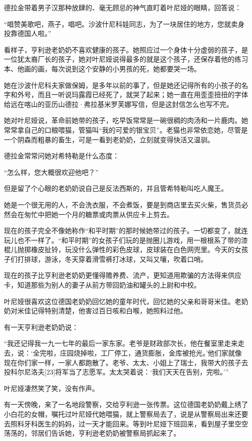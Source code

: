 德拉金带着男子汉那种放肆的、毫无顾忌的神气直盯着叶尼娅的眼睛，回答说：

“唱赞美歌吧，燕子，唱吧。沙波什尼科娃同志，为了一块居住的地方，您就卖身投靠德国人啦。”

看样子，亨利逊老奶奶不喜欢健康的孩子。她照应过一个身体十分虚弱的孩子，是一位犹太裔厂长的孩子，她对叶尼娅说得最多的就是这个孩子，还保存着他的练习本、他画的画，每次说到这个安静的小男孩的死，她都要哭一场。

她在沙波什尼科夫家做保姆，是多年以前的事了，但是她还记得所有的小孩子的名字和外号，而且一听说玛露霞已经死了，就哭了起来；她一直在用歪歪扭扭的字体给远在喀山的亚历山德拉·弗拉基米罗芙娜写信，但是这封信怎么也写不完。

她对叶尼娅说，革命前她带的孩子，吃早饭常常是一碗很稠的肉汤和一片鹿肉。她常常拿自己的口粮喂猫，管猫叫“我的可爱的银宝贝”。老猫也非常依恋她，尽管是一个阴森而粗暴的畜生，可是一看到老奶奶，立刻就变得快活又温驯。

德拉金常常问她对希特勒是什么态度：

“怎么样，您大概很欢迎他吧？”

但是留了个心眼的老奶奶说自己是反法西斯的，并且管希特勒叫吃人魔王。

她是一个很无用的人，不会洗衣服，不会煮饭，要是到商店里去买火柴，售货员必然会在匆忙中把她一个月的糖票或肉票从供应卡上剪去。

现在的孩子完全不像她称作“和平时期”的那时候她带过的孩子。一切都变了，就连玩儿也不一样了。“和平时期”的女孩子们玩的是抛圈儿游戏，用一根根系了带的漆棍儿抛掷橡皮扯铃，玩没什么弹性的彩色皮球，皮球装在白色网兜里。今天的女孩子们打排球，游泳，冬天穿着滑雪裤打冰球，又叫又嚷，吹着口哨。

现在的孩子比亨利逊老奶奶更懂得赡养费、流产，更知道用欺骗的方法得来供应卡，知道那些为别人的妻子从前方带回奶油和罐头的上尉和中校。

叶尼娅很喜欢这位德国老奶奶回忆她的童年时代，回忆她的父亲和哥哥米佳。老奶奶对米佳记得特别清楚，他害过百日咳和白喉，她照料过他。

有一天亨利逊老奶奶说：

“我还记得我一九一七年的最后一家东家。老爷是财政部次长，他在餐室里走来走去，说：‘全完啦，庄园烧掉啦，工厂停工，通货膨胀，金库被抢光。’他们家就像现在你们家一样，一家人都跑散了。老爷、太太、小姐上了瑞士，我带大的孩子去投科尔尼洛夫[23]将军当了志愿军。太太哭着说：‘我们天天在告别，完啦。’”

叶尼娅凄然笑了笑，没有作声。

有一天傍晚，来了一名地段警察，交给亨利逊一张传票。这位德国老奶奶戴上绣了小白花的女帽，嘱托过叶尼娅代她喂猫，就上警察局去了，说是从警察局出来还要去照料牙科医生的妈妈，过一天才能回来。等到叶尼娅下班回来，看到屋子里空空荡荡的，邻居们告诉她，亨利逊老奶奶被警察局抓起来了。

